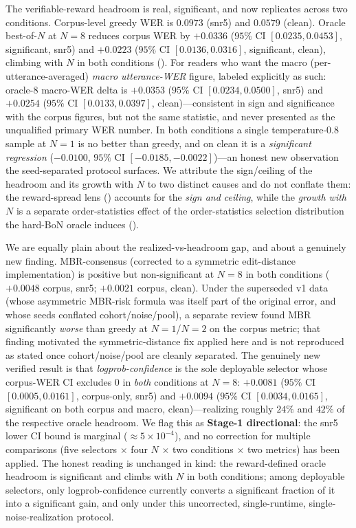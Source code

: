 The verifiable-reward headroom is real, significant, and now replicates across two conditions. Corpus-level greedy WER is $0.0973$ (snr5) and $0.0579$ (clean). Oracle best-of-$N$ at $N{=}8$ reduces corpus WER by $+0.0336$ ($95\%$ CI $[0.0235,0.0453]$, significant, snr5) and $+0.0223$ ($95\%$ CI $[0.0136,0.0316]$, significant, clean), climbing with $N$ in both conditions (). For readers who want the macro (per-utterance-averaged) \emph{macro utterance-WER} figure, labeled explicitly as such: oracle-8 macro-WER delta is $+0.0353$ ($95\%$ CI $[0.0234,0.0500]$, snr5) and $+0.0254$ ($95\%$ CI $[0.0133,0.0397]$, clean)---consistent in sign and significance with the corpus figures, but not the same statistic, and never presented as the unqualified primary WER number. In both conditions a single temperature-$0.8$ sample at $N{=}1$ is no better than greedy, and on clean it is a \emph{significant regression} ($-0.0100$, $95\%$ CI $[-0.0185,-0.0022]$)---an honest new observation the seed-separated protocol surfaces. We attribute the sign/ceiling of the headroom and its growth with $N$ to two distinct causes and do not conflate them: the reward-spread lens () accounts for the \emph{sign and ceiling}, while the \emph{growth with $N$} is a separate order-statistics effect of the order-statistics selection distribution the hard-BoN oracle induces ().

We are equally plain about the realized-vs-headroom gap, and about a genuinely new finding. MBR-consensus (corrected to a symmetric edit-distance implementation) is positive but non-significant at $N{=}8$ in both conditions ($+0.0048$ corpus, snr5; $+0.0021$ corpus, clean). Under the superseded v1 data (whose asymmetric MBR-risk formula was itself part of the original error, and whose seeds conflated cohort/noise/pool), a separate review found MBR significantly \emph{worse} than greedy at $N{=}1$/$N{=}2$ on the corpus metric; that finding motivated the symmetric-distance fix applied here and is not reproduced as stated once cohort/noise/pool are cleanly separated. The genuinely new verified result is that \emph{logprob-confidence} is the sole deployable selector whose corpus-WER CI excludes $0$ in \emph{both} conditions at $N{=}8$: $+0.0081$ ($95\%$ CI $[0.0005,0.0161]$, corpus-only, snr5) and $+0.0094$ ($95\%$ CI $[0.0034,0.0165]$, significant on both corpus and macro, clean)---realizing roughly $24\%$ and $42\%$ of the respective oracle headroom. We flag this as \textbf{Stage-1 directional}: the snr5 lower CI bound is marginal ($\approx5\times10^{-4}$), and no correction for multiple comparisons (five selectors $\times$ four $N$ $\times$ two conditions $\times$ two metrics) has been applied. The honest reading is unchanged in kind: the reward-defined oracle headroom is significant and climbs with $N$ in both conditions; among deployable selectors, only logprob-confidence currently converts a significant fraction of it into a significant gain, and only under this uncorrected, single-runtime, single-noise-realization protocol.

